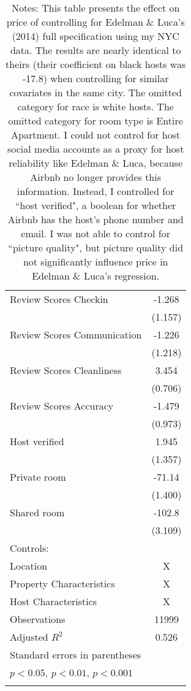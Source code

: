 {\begin{longtable}{l*{1}{c}}
Review Scores Checkin&      -1.268         \\
                    &     (1.157)         \\
Review Scores Communication&      -1.226         \\
                    &     (1.218)         \\
Review Scores Cleanliness&       3.454\sym{***}\\
                    &     (0.706)         \\
Review Scores Accuracy&      -1.479         \\
                    &     (0.973)         \\
Host verified &       1.945         \\
                    &     (1.357)         \\
Private room        &      -71.14\sym{***}\\
                    &     (1.400)         \\
Shared room         &      -102.8\sym{***}\\
                    &     (3.109)         \\
\hline
Controls:        \\
\hspace{3mm} Location  &                           X      \\
\hspace{3mm} Property Characteristics  &   X         \\
\hspace{3mm} Host Characteristics  &         X        \\
\hline
Observations        &       11999         \\
Adjusted \(R^{2}\)  &       0.526         \\
\hline\hline
\multicolumn{2}{l}{\footnotesize Standard errors in parentheses}\\
\multicolumn{2}{l}{\footnotesize \sym{*} \(p<0.05\), \sym{**} \(p<0.01\), \sym{***} \(p<0.001\)}\\
\caption*{Notes: This table presents the effect on price of controlling for Edelman \& Luca's (2014) full specification using my NYC data. The results are nearly identical to theirs (their coefficient on black hosts was -17.8) when controlling for similar covariates in the same city. The omitted category for race is white hosts. The omitted category for room type is Entire Apartment. I could not control for host social media accounts as a proxy for host reliability like Edelman \& Luca, because Airbnb no longer provides this information. Instead, I controlled for ``host verified", a boolean for whether Airbnb has the host's phone number and email. I was not able to control for ``picture quality", but picture quality did not significantly influence price in Edelman \& Luca's regression.}\\
\end{longtable}
}


